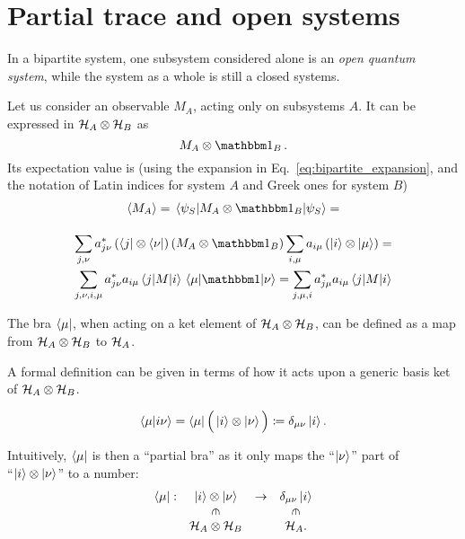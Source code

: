 \section{Partial trace and open systems}
\label{sec:p_tr}

In a bipartite system, one subsystem considered alone is an
\emph{open quantum system},
while the system as a whole is still a closed systems.

Let us consider an observable $M_A$, acting only on subsystems $A$.
It can be expressed in $\mathcal{H}_A \otimes \mathcal{H}_B$ as
\[
  M_A \otimes \idop_B\, .
\]
Its expectation value is
(using the expansion in Eq.~\eqref{eq:bipartite_expansion},
and the notation of Latin indices for system $A$ and Greek ones for system $B$)
\begin{multline}\label{eq:exp_subsys}
  \expval{M_A} = \matrixel{\psi_S}{M_A\otimes\idop_B}{\psi_S} = \\[1em]
  \sum_{j,\nu}a^{*}_{j\nu}\left(\bra{j}\otimes\bra{\nu}\right)\left(M_A\otimes\idop_B\right)\sum_{i,\mu}a_{i\mu}\left(\ket{i}\otimes\ket{\mu}\right) = \\
  \sum_{j,\nu,i,\mu}a^{*}_{j\nu}a_{i\mu}\matrixel{j}{M}{i}\matrixel{\mu}{\idop}{\nu} =
  \sum_{j,\mu,i}a^{*}_{j\mu}a_{i\mu}\matrixel{j}{M}{i}
\end{multline}

The bra $\bra{\mu}$, when acting on a ket element of $\mathcal{H}_{A} \otimes \mathcal{H}_{B}$,
can be defined
as a map from $\mathcal{H}_A\otimes\mathcal{H}_B$ to $\mathcal{H}_A$.

A formal definition can be given in terms of how it acts upon a generic
basis ket of $\mathcal{H}_A\otimes\mathcal{H}_B$.

\begin{definition}\label{def:pBra}
\[
  \braket{\mu}{i\nu} = \bra{\mu}\Big(\ket{i}\otimes\ket{\nu}\Big) \coloneqq \delta_{\mu\nu}\ket{i} \text{.}
\]
\end{definition}

Intuitively, $\bra{\mu}$ is then a ``partial bra''
as it only maps the ``$\ket{\nu}$'' part of\\
``$\ket{i}\otimes\ket{\nu}$''
to a number:
\[
  \begin{array}{cccc}
    \bra{\mu}:  & \ket{i}\ox\ket{\nu}                   & \rightarrow & \delta_{\mu\nu}\ket{i}                \\
                & \rotatebox[origin=c]{270}{$\in$}      &             & \rotatebox[origin=c]{270}{$\in$}      \\
                & \hilb{H}_A\ox\hilb{H}_B               &             & \hilb{H}_A   \text{.}
  \end{array}
\]

